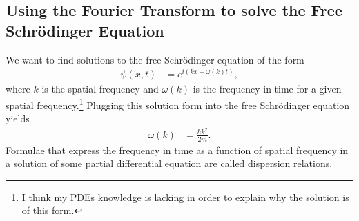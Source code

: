 \documentclass[12pt]{extarticle}
\theoremstyle{plain}
\theoremstyle{definition}
\theoremstyle{remark}
\renewcommand{\newline}{\hfill\break}
\begin{document}
  \subsection{Using the Fourier Transform to solve the Free Schrödinger Equation}%
  We want to find solutions to the free Schrödinger equation of the form
  \begin{align*}
    \psi(x,t) &= e^{i(kx - \omega(k)t)},
  \end{align*}
  where $k$ is the spatial frequency and $\omega(k)$ is the frequency in time for a given spatial frequency.\footnote{I think my PDEs knowledge is lacking in order to explain why the solution is of this form.} Plugging this solution form into the free Schrödinger equation yields
  \begin{align*}
    \omega(k) &= \frac{\hbar k^2}{2m}.
  \end{align*}
  Formulae that express the frequency in time as a function of spatial frequency in a solution of some partial differential equation are called dispersion relations.\newline
\end{document}
